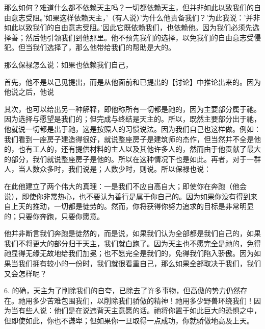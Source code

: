 那么如何？难道什么都不依赖天主吗？一切都依赖天主，但并非如此以致我们的自由意志受阻。'如果这样依赖天主，'（有人说）'为什么他责备我们？'为此我说：'并非如此以致我们的自由意志受阻。'因此它既依赖我们，也依赖他。因为我们必须先选择善；然后他引领我们到他那里。他不预先我们的选择，以免我们的自由意志受侵犯。但当我们选择了，那么他带给我们的帮助是大的。\par

那么保禄怎么说：如果也依赖我们自己，\par

首先，他不是以己见提出，而是从他面前和已提出的【讨论】中推论出来的。因为他说之后，他说\par

其次，也可以给出另一种解释，即他称所有一切都是祂的，因为主要部分属于祂。因为选择与愿望是我们的；但完成与终结是天主的。所以，既然主要部分出于祂，他就说一切都是出于祂，这是按照人的习惯说法。因为我们自己也这样做。例如：我们看到一座房子建造得很好，就说整座房子是建筑师的杰作，但当然并不全是他的，也有工人的，还有提供材料的主人以及其他许多人的，然而由于他贡献了最大的部分，我们就说整座房子是他的。所以在这种情况下也是如此。再者，对于一群人，当人数众多时，我们说是；人数少时，则说。所以保禄也说：\par

在此他建立了两个伟大的真理：一是我们不应自高自大；即使你在奔跑（他会说），即使你非常热心，也不要认为善行是属于你自己的。因为如果你没有得到来自上天的推动，一切都是徒劳的。然而，你将获得你努力追求的目标是非常明显的；只要你奔跑，只要你愿意。\par

他并非断言我们奔跑是徒然的，而是说，如果我们认为全部都是我们自己的，如果我们不将更大的部分归于天主，我们就白跑了。因为天主也不愿完全是祂的，免得祂显得无缘无故地给我们加冕；也不愿完全是我们的，免得我们陷入骄傲。因为如果当我们拥有较小的一份时，我们就很看重自己，那么如果全部取决于我们，我们又会怎样呢？\par

6. 的确，天主为了削除我们的自夸，已除去了许多事物，但高傲的势力仍然存在。祂用多少苦难包围我们，以削除我们骄傲的精神！祂用多少野兽环绕我们！因为当有些人说：他们是在说违背天主意愿的话。祂将你置于如此巨大的恐惧之中，但即使如此，你也不谦卑；但如果你一旦取得一点成功，你就骄傲地高及上天。\par

